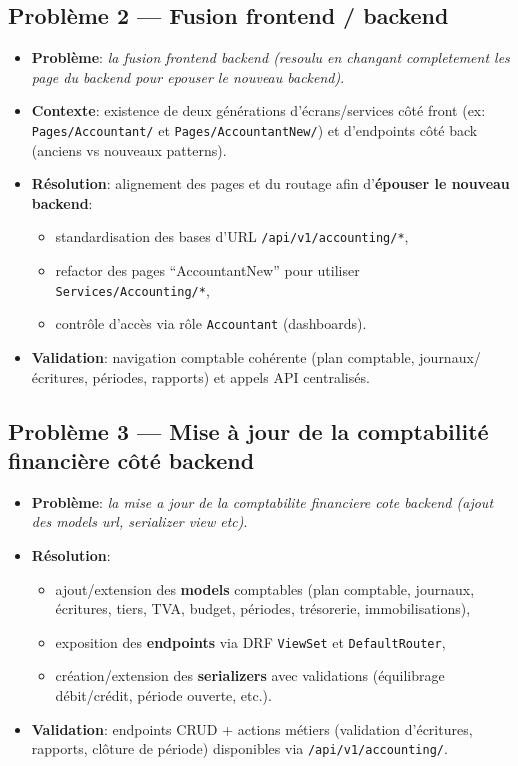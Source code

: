 \documentclass[12pt,a4paper]{article}
\begin{document}
\subsection{Problème 2 --- Fusion frontend / backend}
\begin{itemize}[leftmargin=1.2cm]
  \item \textbf{Problème}: \textit{la fusion frontend backend (resoulu en changant completement les page du backend pour epouser le nouveau backend)}.
  \item \textbf{Contexte}: existence de deux générations d’écrans/services côté front (ex: \texttt{Pages/Accountant/} et \texttt{Pages/AccountantNew/}) et d’endpoints côté back (anciens vs nouveaux patterns).
  \item \textbf{Résolution}: alignement des pages et du routage afin d’\textbf{épouser le nouveau backend}:
  \begin{itemize}[leftmargin=1.2cm]
    \item standardisation des bases d’URL \texttt{/api/v1/accounting/*},
    \item refactor des pages “AccountantNew” pour utiliser \texttt{Services/Accounting/*},
    \item contrôle d’accès via rôle \texttt{Accountant} (dashboards).
  \end{itemize}
  \item \textbf{Validation}: navigation comptable cohérente (plan comptable, journaux/écritures, périodes, rapports) et appels API centralisés.
\end{itemize}

\subsection{Problème 3 --- Mise à jour de la comptabilité financière côté backend}
\begin{itemize}[leftmargin=1.2cm]
  \item \textbf{Problème}: \textit{la mise a jour de la comptabilite financiere cote backend (ajout des models url, serializer view etc)}.
  \item \textbf{Résolution}:
  \begin{itemize}[leftmargin=1.2cm]
    \item ajout/extension des \textbf{models} comptables (plan comptable, journaux, écritures, tiers, TVA, budget, périodes, trésorerie, immobilisations),
    \item exposition des \textbf{endpoints} via DRF \texttt{ViewSet} et \texttt{DefaultRouter},
    \item création/extension des \textbf{serializers} avec validations (équilibrage débit/crédit, période ouverte, etc.).
  \end{itemize}
  \item \textbf{Validation}: endpoints CRUD + actions métiers (validation d’écritures, rapports, clôture de période) disponibles via \texttt{/api/v1/accounting/}.
\end{itemize}
\end{document}
